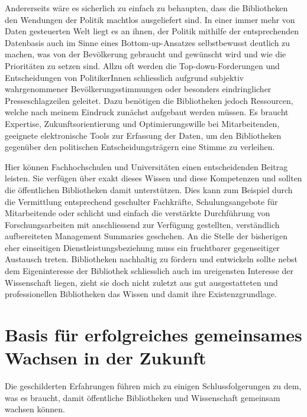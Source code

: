 \documentclass[a4paper,
fontsize=11pt,
oneside,
numbers=noperiodatend,
parskip=half-,
bibliography=totoc,
final
]{scrartcl}
\begin{document}
Andererseits wäre es sicherlich zu einfach zu behaupten, dass die
Bibliotheken den Wendungen der Politik machtlos ausgeliefert sind. In
einer immer mehr von Daten gesteuerten Welt liegt es an ihnen, der
Politik mithilfe der entsprechenden Datenbasis auch im Sinne eines
Bottom-up-Ansatzes selbstbewusst deutlich zu machen, was von der
Bevölkerung gebraucht und gewünscht wird und wie die Prioritäten zu
setzen sind. Allzu oft werden die Top-down-Forderungen und
Entscheidungen von PolitikerInnen schliesslich aufgrund subjektiv
wahrgenommener Bevölkerungsstimmungen oder besonders eindringlicher
Presseschlagzeilen geleitet. Dazu benötigen die Bibliotheken jedoch
Ressourcen, welche nach meinem Eindruck zunächst aufgebaut werden
müssen. Es braucht Expertise, Zukunftsorientierung und Optimierungswille
bei Mitarbeitenden, geeignete elektronische Tools zur Erfassung der
Daten, um den Bibliotheken gegenüber den politischen
Entscheidungsträgern eine Stimme zu verleihen.

Hier können Fachhochschulen und Universitäten einen entscheidenden
Beitrag leisten. Sie verfügen über exakt dieses Wissen und diese
Kompetenzen und sollten die öffentlichen Bibliotheken damit
unterstützen. Dies kann zum Beispiel durch die Vermittlung entsprechend
geschulter Fachkräfte, Schulungsangebote für Mitarbeitende oder schlicht
und einfach die verstärkte Durchführung von Forschungsarbeiten mit
anschliessend zur Verfügung gestellten, verständlich aufbereiteten
Management Summaries geschehen. An die Stelle der bisherigen eher
einseitigen Dienstleistungsbeziehung muss ein fruchtbarer gegenseitiger
Austausch treten. Bibliotheken nachhaltig zu fördern und entwickeln
sollte nebst dem Eigeninteresse der Bibliothek schliesslich auch im
ureigensten Interesse der Wissenschaft liegen, zieht sie doch nicht
zuletzt aus gut ausgestatteten und professionellen Bibliotheken das
Wissen und damit ihre Existenzgrundlage.

\hypertarget{basis-fuxfcr-erfolgreiches-gemeinsames-wachsen-in-der-zukunft}{%
\section{Basis für erfolgreiches gemeinsames Wachsen in der
Zukunft}\label{basis-fuxfcr-erfolgreiches-gemeinsames-wachsen-in-der-zukunft}}

Die geschilderten Erfahrungen führen mich zu einigen Schlussfolgerungen
zu dem, was es braucht, damit öffentliche Bibliotheken und Wissenschaft
gemeinsam wachsen können.
\end{document}
